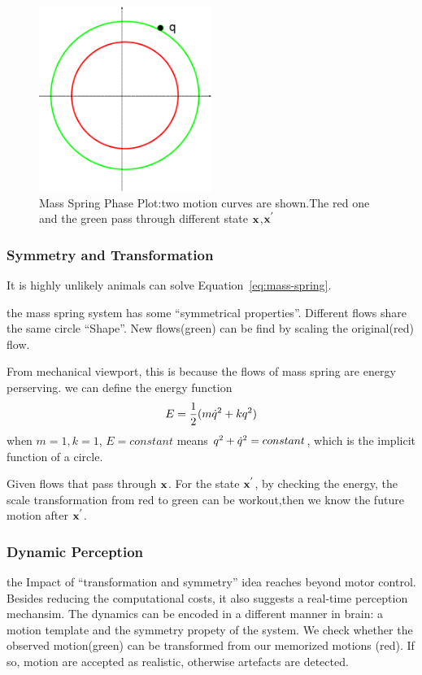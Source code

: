 \begin{figure}[!htbp]
\label{fig:massSpringPhasePlot}  
  \begin{center}
     \includegraphics[width=0.5\textwidth]{MassSpringPhasePlot}
    \caption{Mass Spring Phase Plot:two motion curves are shown.The red one and the green pass through different state $\mathbf{x}$,$\mathbf{x}^{'}$}
  \end{center}
\end{figure}

\subsubsection*{Symmetry and Transformation}
It is highly unlikely animals can solve Equation~\ref{eq:mass-spring}.

the mass spring system has some ``symmetrical properties''.
Different flows share the same circle ``Shape''.
New flows(green) can be find by scaling the original(red) flow.

From mechanical viewport, this is because the flows of mass spring are energy perserving.
we can define the energy function
\[
E=\frac{1}{2}(m\dot{q}^2+kq^2)
\]
when $m=1,k=1$, $E=constant$ means $q^2+\dot{q}^2=constant$, which is the implicit function of a circle.

Given flows that pass through  $\mathbf{x}$.
For the state $\mathbf{x}^{'}$, by checking the energy, the scale transformation from red to green can be workout,then we know the future motion after $\mathbf{x}^{'}$.


\subsubsection*{Dynamic Perception}
the Impact of ``transformation and symmetry'' idea reaches beyond motor control. 
Besides reducing the computational costs, it also suggests a real-time perception mechansim.
The dynamics can be encoded in a different manner in brain: a motion template and the symmetry propety of the system.
We check whether the observed motion(green) can be transformed from our memorized motions (red).
If so, motion are accepted as realistic, otherwise artefacts are detected.


